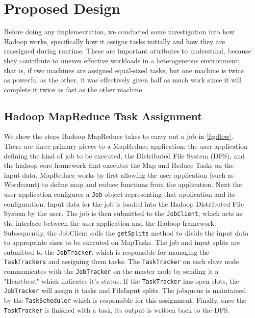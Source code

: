 \section{Proposed Design}
\label{section:propeseddesign}

Before doing any implementation, we conducted some investigation into how Hadoop works,
specifically how it assigns tasks initially and how they are reassigned during runtime.
These are important attributes to understand, because they contribute to uneven effective
workloads in a heterogeneous environment; that is, if two machines are assigned equal-sized
tasks, but one machine is twice as powerful as the other, it was effectively given half as
much work since it will complete it twice as fast as the other machine.

\subsection{Hadoop MapReduce Task Assignment}

We show the steps Hadoop MapReduce takes to carry out a job in \ref{fig:flow}. There are
three primary pieces to a MapReduce application: the user application defining the kind of job
to be executed, the Distributed File System (DFS), and the hadoop core framework that executes
the Map and Reduce Tasks on the input data. MapReduce
works by first allowing the user application (such as Wordcount) to define map and reduce functions
from the application.
Next the user application configures a \texttt{Job} object representing that application and its configuration.
Input data for the job is loaded into the Hadoop Distributed File System by the user.
The job is then submitted to the \texttt{JobClient}, which acts as the interface between the user
application and the Hadoop framework. Subsequently, the JobClient calls the
\texttt{getSplits} method to divide the input data to appropriate sizes to be executed on MapTasks. The job and
input splits are submitted to the \texttt{JobTracker}, which is responsible for managing the \texttt{TaskTrackers} and assigning them
tasks. The \texttt{TaskTracker} on each slave node communicates with
the \texttt{JobTracker} on the master node by sending it a "Heartbeat" which indicates it's status. If the \texttt{TaskTracker}
has open slots, the \texttt{JobTracker} will assign it tasks and FileInput splits. The jobqueue is maintained by the
\texttt{TaskScheduler} which is responsible for this assignment. Finally, once the \texttt{TaskTracker} is finished
with a task, its output is written back to the DFS.

